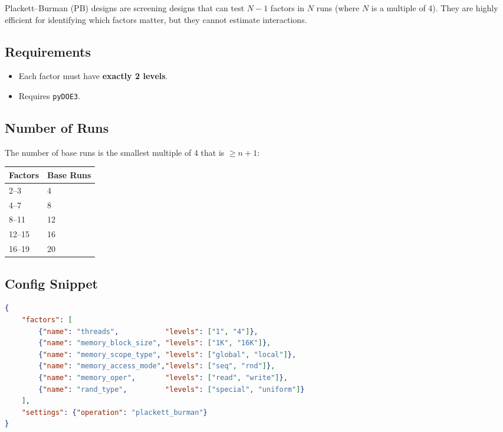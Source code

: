 \documentclass[11pt]{book}
\begin{document}
Plackett--Burman (PB) designs are screening designs that can test $N-1$ factors in $N$ runs (where $N$ is a multiple of 4). They are highly efficient for identifying which factors matter, but they cannot estimate interactions.

\subsection{Requirements}
\begin{itemize}[nosep]
  \item Each factor must have \textbf{exactly 2 levels}.
  \item Requires \texttt{pyDOE3}.
\end{itemize}

\subsection{Number of Runs}

The number of base runs is the smallest multiple of 4 that is $\geq n + 1$:

\begin{table}[H]
\centering
\begin{tabular}{@{}ll@{}}
\toprule
\textbf{Factors} & \textbf{Base Runs} \\
\midrule
2--3 & 4 \\
4--7 & 8 \\
8--11 & 12 \\
12--15 & 16 \\
16--19 & 20 \\
\bottomrule
\end{tabular}
\end{table}

\subsection{Config Snippet}

\begin{lstlisting}[language=json]
{
    "factors": [
        {"name": "threads",           "levels": ["1", "4"]},
        {"name": "memory_block_size", "levels": ["1K", "16K"]},
        {"name": "memory_scope_type", "levels": ["global", "local"]},
        {"name": "memory_access_mode","levels": ["seq", "rnd"]},
        {"name": "memory_oper",       "levels": ["read", "write"]},
        {"name": "rand_type",         "levels": ["special", "uniform"]}
    ],
    "settings": {"operation": "plackett_burman"}
}
\end{lstlisting}
\end{document}
